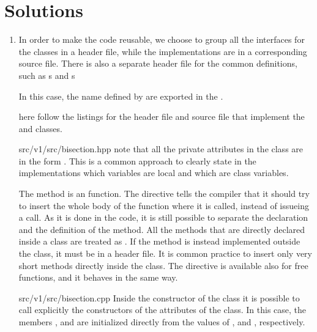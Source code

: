 \section*{Solutions}

\begin{enumerate}

    \item In order to make the code reusable, we choose to group all the
    interfaces for the classes in a header file, while the implementations are
    in a corresponding source file. There is also a separate header file for
    the common definitions, such as s and s

    \lstset{basicstyle=\scriptsize\sf}
    
    \lstset{basicstyle=\sf}

    In this case, the name defined by  are exported in the
     .

    here follow the listings for the header file and source file that implement
    the  and  classes.
    \lstset{basicstyle=\scriptsize\sf}
    
      {src/v1/src/bisection.hpp}
    \lstset{basicstyle=\sf}
    note that all the private attributes in the class are in the form
    . This is a common approach to clearly state in the
    implementations which variables are local and which are class variables.

    The  method is an  function. The 
    directive tells the compiler that it should try to insert the whole body of
    the function where it is called, instead of issueing a call. As it is done
    in the code, it is still possible to separate the declaration and the
    definition of the method. All the methods that are directly declared inside
    a class are treated as . If the method is instead implemented
    outside the class, it must be in a header file. It is common practice to
    insert only very short methods directly inside the class. The 
    directive is available also for free functions, and it behaves in the same
    way.
    \lstset{basicstyle=\scriptsize\sf}
    
    {src/v1/src/bisection.cpp}
    \lstset{basicstyle=\sf}
    Inside the constructor of the class it is possible to call explicitly the
    constructors of the attributes of the class. In this case, the members 
    ,  and  are initialized directly from
    the values of ,  and , respectively.


\end{enumerate}
